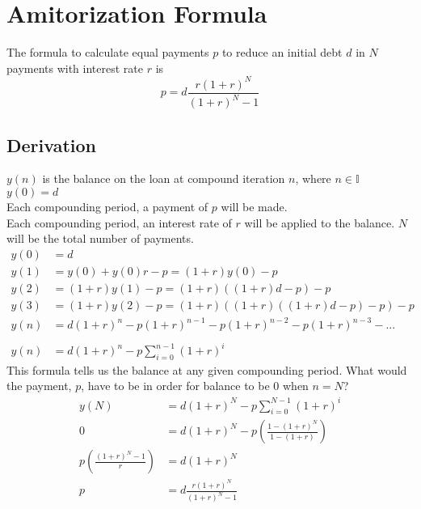 \section{Amitorization Formula}
The formula to calculate equal payments \(p\) to reduce an initial debt \(d\) in \(N\) payments with interest rate \(r\) is\\

\[p = d\frac{r(1+r)^N}{(1+r)^N -1}\]

\subsection{Derivation}
\(y(n)\) is the balance on the loan at compound iteration \(n\), where \(n \in \mathbb{I} \)\\
\(y(0) = d\) \\
Each compounding period, a payment of \(p\) will be made.\\
Each compounding period, an interest rate of \(r\) will be applied to the balance.
\(N\) will be the total number of payments.\\

\begin{align*}
y(0) &= d \\
y(1) &= y(0) + y(0)r - p = (1+r)y(0) -p\\
y(2) &= (1+r)y(1) -p = (1+r)((1+r)d -p) -p \\
y(3) &= (1+r)y(2) -p = (1+r)((1+r)((1+r)d -p) -p) -p \\
y(n) &= d(1+r)^n -p(1+r)^{n-1} -p(1+r)^{n-2} -p(1+r)^{n-3} - ...\\
\\
y(n) &= d(1+r)^n -p\sum\limits_{i=0}^{n-1}{{(1+r)}^i}
\end{align*}
This formula tells us the balance at any given compounding period.  What would the payment, \(p\), have to be in order for balance to be 0 when \(n=N\)?\\
\begin{align*}
y(N) &= d(1+r)^N -p\sum\limits_{i=0}^{N-1}{{(1+r)}^i} \\
0 &= d(1+r)^N -p\left( \frac{1-(1+r)^N}{1-(1+r)} \right) \\
p\left( \frac{(1+r)^N -1}{r} \right) &= d(1+r)^N \\
p &= d\frac{r(1+r)^N}{(1+r)^N -1}
\end{align*}